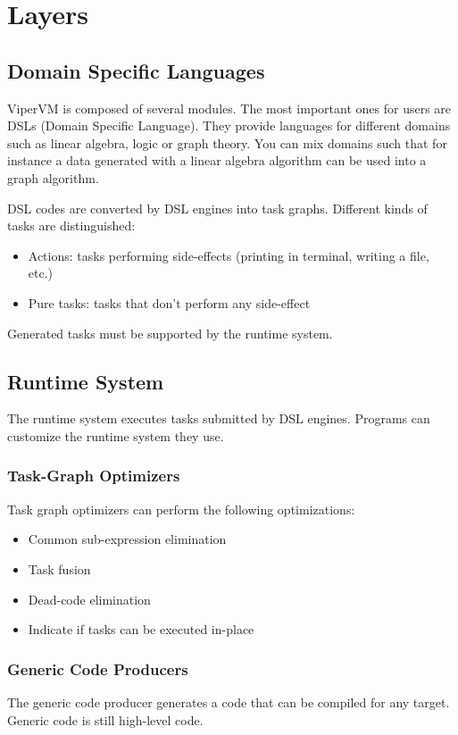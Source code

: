 \chapter{Layers}

\section{Domain Specific Languages}
ViperVM is composed of several modules.
The most important ones for users are DSLs (Domain Specific Language).
They provide languages for different domains such as linear algebra, logic or graph theory.
You can mix domains such that for instance a data generated with a linear algebra algorithm can be used into a graph algorithm.

DSL codes are converted by DSL engines into task graphs.
Different kinds of tasks are distinguished:
\begin{itemize}
  \item Actions: tasks performing side-effects (printing in terminal, writing a file, etc.)
  \item Pure tasks: tasks that don't perform any side-effect
\end{itemize}

Generated tasks must be supported by the runtime system.

\section{Runtime System}
The runtime system executes tasks submitted by DSL engines.
Programs can customize the runtime system they use.

\subsection{Task-Graph Optimizers}
Task graph optimizers can perform the following optimizations:
\begin{itemize}
  \item Common sub-expression elimination
  \item Task fusion
  \item Dead-code elimination
  \item Indicate if tasks can be executed in-place
\end{itemize}

\subsection{Generic Code Producers}
The generic code producer generates a code that can be compiled for any target.
Generic code is still high-level code.

